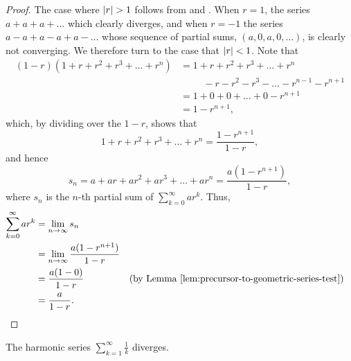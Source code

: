 \begin{proof}
  The case where $| r | > 1$ follows from
   and
  . When $r = 1$, the
  series $a + a + a + \dots$ which clearly diverges, and when $r =
  -1$ the series $a - a + a - a + a - \dots$ whose sequence of
  partial sums, $(a, 0, a, 0, \dots)$, is clearly not converging. We
  therefore turn to the case that $| r | < 1$. Note that
  \begin{align*}
    (1 - r) (1 + r + r^2 + r^3 + \dots + r^n) & = 1 + r + r^2 + r^3 +
    \dots + r^n \\
    & \phantom{=} \:\:\:\:\, - r - r^2 - r^3 - \dots - r^{n - 1} -
    r^{n + 1} \\
    & = 1 + 0 + 0 + \dots + 0 - r^{n + 1} \\
    & = 1 - r^{n + 1},
  \end{align*}
  which, by dividing over the $1 - r$, shows that
  \[ 1 + r + r^2 + r^3 + \dots + r^n = \frac{1 - r^{n + 1}}{1 - r}, \]
  and hence
  \[ s_n = a + ar + ar^2 + ar^3 + \dots + ar^n = \frac{a(1 - r^{n +
  1})}{1 - r}, \]
  where $s_n$ is the $n$-th partial sum of $\sum_{k = 0}^{\infty} ar^k$. Thus,
  \begin{align*}
    \sum_{k = 0}^{\infty} ar^k & = \lim_{n \to \infty} s_n \\
    & = \lim_{n \to \infty} \frac{a(1 - r^{n + 1})}{1 - r} \\
    & = \frac{a(1 - 0)}{1 - r} && \text{(by
    \lemref{precursor-to-geometric-series-test})} \\
    & = \frac{a}{1 - r}.
  \end{align*}
\end{proof}

\begin{theorem}
  The harmonic series $\sum_{k = 1}^{\infty} \frac{1}{k}$ diverges.
\end{theorem}

